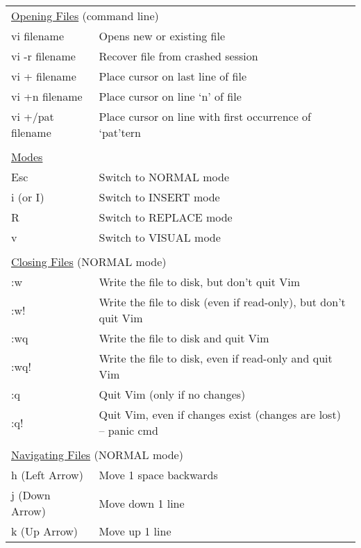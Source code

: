 \documentclass[11pt,a4paper,oneside]{article}
\begin{document}

\begin{table}
\vspace{-0.3cm}
\begin{tabular}{p{5.5cm} l}
\multicolumn{2}{l}{\underline{Opening Files} (command line)} \\
vi filename & Opens new or existing file \\
vi -r filename & Recover file from crashed session \\
vi + filename & Place cursor on last line of file \\
vi +n filename & Place cursor on line `n' of file \\
vi +/pat filename & Place cursor on line with first occurrence of `pat'tern \\
 & \\[-1.5ex]
\multicolumn{2}{l}{\underline{Modes}} \\
 Esc & Switch to NORMAL mode \\
 i (or I) & Switch to INSERT mode \\
 R & Switch to REPLACE mode \\
 v & Switch to VISUAL mode \\
 & \\[-1.5ex]
\multicolumn{2}{l}{\underline{Closing Files} (NORMAL mode)} \\
:w & Write the file to disk, but don't quit Vim \\
:w! & Write the file to disk (even if read-only), but don't quit Vim \\
:wq & Write the file to disk and quit Vim \\
:wq! & Write the file to disk, even if read-only and quit Vim\\
:q & Quit Vim (only if no changes) \\
:q! & Quit Vim, even if changes exist (changes are lost) -- panic cmd \\
 & \\[-1.5ex]
\multicolumn{2}{l}{\underline{Navigating Files} (NORMAL mode)} \\
h (Left Arrow) & Move 1 space backwards \\
j (Down Arrow) & Move down 1 line \\
k (Up Arrow) & Move up 1 line \\

\end{tabular}
\end{table}
\end{document}
